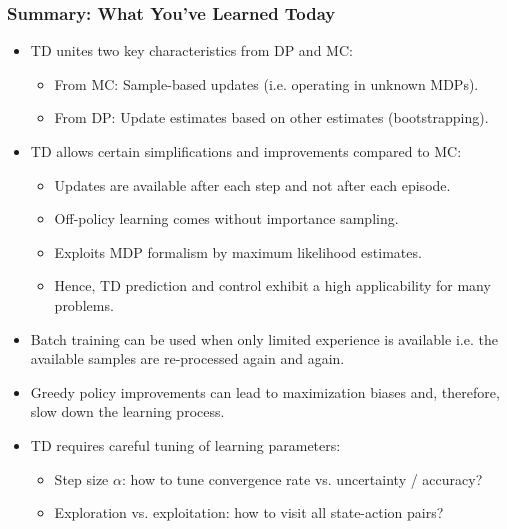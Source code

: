 \begin{frame}
\frametitle{Summary: What You've Learned Today}
\begin{itemize}
	\item TD unites two key characteristics from DP and MC:
	\begin{itemize}
		\item From MC: Sample-based updates (i.e. operating in unknown MDPs).
		\item From DP: Update estimates based on other estimates (bootstrapping).
	\end{itemize}\pause
	\item TD allows certain simplifications and improvements compared to MC:
	\begin{itemize}
		\item Updates are available after each step and not after each episode.\pause
		\item Off-policy learning comes without importance sampling.\pause
		\item Exploits MDP formalism by maximum likelihood estimates. \pause
		\item Hence, TD prediction and control exhibit a high applicability for many problems.\pause
	\end{itemize}
	\item Batch training can be used when only limited experience is available i.e. the available samples are re-processed again and again.\pause
	\item Greedy policy improvements can lead to maximization biases and, therefore, slow down the learning process. \pause
	\item TD requires careful tuning of learning parameters:
	\begin{itemize}
		\item Step size $\alpha$: how to tune convergence rate vs. uncertainty / accuracy?
		\item Exploration vs. exploitation: how to visit all state-action pairs?
	\end{itemize}
\end{itemize}
\end{frame}

